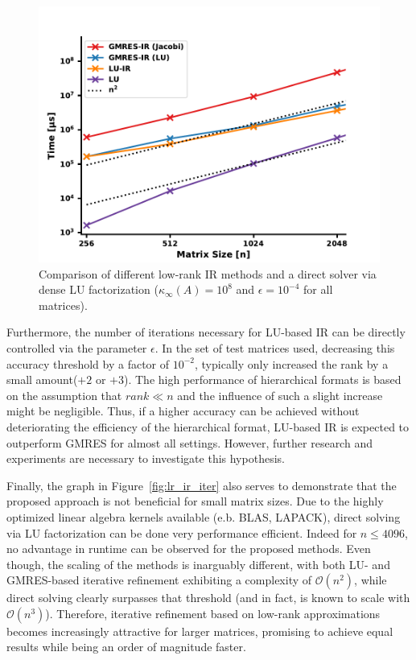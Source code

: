 \begin{figure}[h]
    \centering
    \includegraphics[width=0.7\linewidth]{chapters/5_experiments/figures/LR_scaling.pdf}
    \caption[Low-Rank IR - Runtime]{Comparison of different low-rank IR methods and a direct solver via dense LU factorization ($\kappa_\infty(A)=10^8$ and $\epsilon = 10^{-4}$ for all matrices).}
    \label{fig:lr_ir_scaling}
\end{figure}

Furthermore, the number of iterations necessary for LU-based IR can be directly controlled via the parameter $\epsilon$. In the set of test matrices used, decreasing this accuracy threshold by a factor of $10^{-2}$, typically only increased the rank by a small amount($+2$ or $+3$). The high performance of hierarchical formats is based on the assumption that $rank \ll n$ and the influence of such a slight increase might be negligible. Thus, if a higher accuracy can be achieved without deteriorating the efficiency of the hierarchical format, LU-based IR is expected to outperform GMRES for almost all settings. However, further research and experiments are necessary to investigate this hypothesis.

Finally, the graph in Figure~\hyperref[fig:lr_ir_iter]{\ref{fig:lr_ir_iter}} also serves to demonstrate that the proposed approach is not beneficial for small matrix sizes. Due to the highly optimized linear algebra kernels available (e.b. BLAS, LAPACK), direct solving via LU factorization can be done very performance efficient. Indeed for $n \leq 4096$, no advantage in runtime can be observed for the proposed methods. Even though, the scaling of the methods is inarguably different, with both LU- and GMRES-based iterative refinement exhibiting a complexity of $\mathcal{O}(n^2)$, while direct solving clearly surpasses that threshold (and in fact, is known to scale with $\mathcal{O}(n^3)$). Therefore, iterative refinement based on low-rank approximations becomes increasingly attractive for larger matrices, promising to achieve equal results while being an order of magnitude faster.



